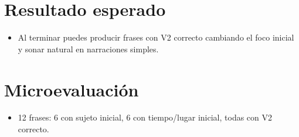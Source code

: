 \section{Resultado esperado}
\begin{itemize}[leftmargin=*]
	\item Al terminar puedes producir frases con V2 correcto cambiando el foco inicial y sonar natural en narraciones simples.
\end{itemize}

\section{Microevaluación}
\begin{itemize}[leftmargin=*]
	\item 12 frases: 6 con sujeto inicial, 6 con tiempo/lugar inicial, todas con V2 correcto.
\end{itemize}
